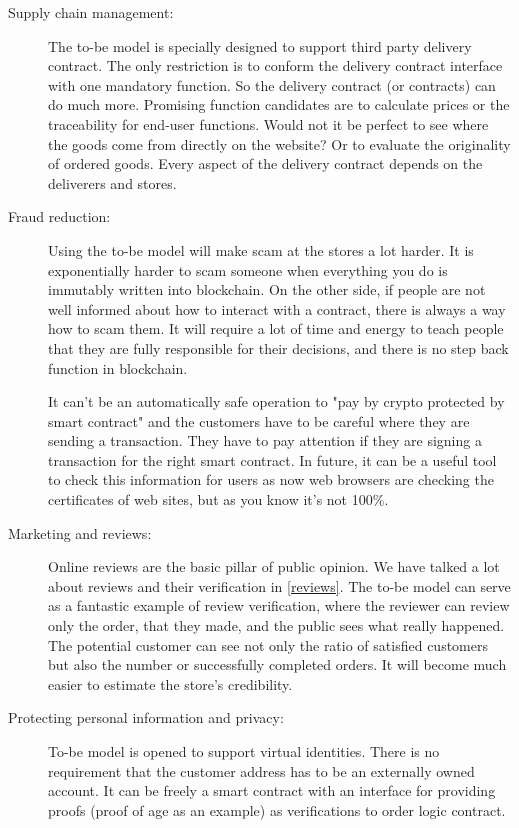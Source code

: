 \documentclass[thesis=M,english]{FITthesis}[2019/12/23]
\begin{document}
\begin{description}
    
\item[Supply chain management:] The to-be model is specially designed to support third party delivery contract. The only restriction is to conform the delivery contract interface with one mandatory function. So the delivery contract (or contracts) can do much more. Promising function candidates are to calculate prices or the traceability for end-user functions. Would not it be perfect to see where the goods come from directly on the website? Or to evaluate the originality of ordered goods. Every aspect of the delivery contract depends on the deliverers and stores. 

\item[Fraud reduction:] Using the to-be model will make scam at the stores a lot harder. It is exponentially harder to scam someone when everything you do is immutably written into blockchain. On the other side, if people are not well informed about how to interact with a contract, there is always a way how to scam them. It will require a lot of time and energy to teach people that they are fully responsible for their decisions, and there is no step back function in blockchain.

It can't be an automatically safe operation to "pay by crypto protected by smart contract" and the customers have to be careful where they are sending a transaction. They have to pay attention if they are signing a transaction for the right smart contract. In future, it can be a useful tool to check this information for users as now web browsers are checking the certificates of web sites, but as you know it's not 100\%.

\item[Marketing and reviews:] Online reviews are the basic pillar of public opinion. We have talked a lot about reviews and their verification in \ref{reviews}. The to-be model can serve as a fantastic example of review verification, where the reviewer can review only the order, that they made, and the public sees what really happened. The potential customer can see not only the ratio of satisfied customers but also the number or successfully completed orders. It will become much easier to estimate the store's credibility.

\item[Protecting personal information and privacy:] To-be model is opened to support virtual identities. There is no requirement that the customer address has to be an externally owned account. It can be freely a smart contract with an interface for providing proofs (proof of age as an example) as verifications to order logic contract. 


\end{description}
\end{document}
